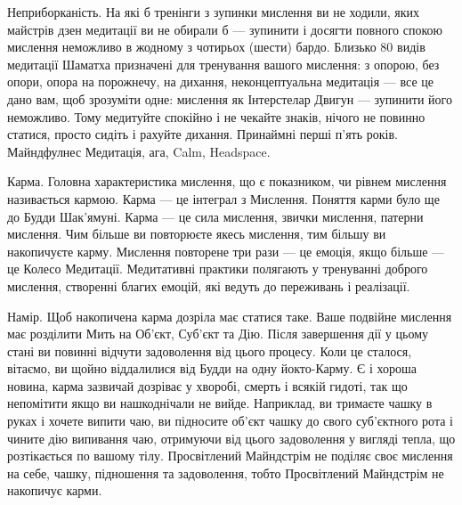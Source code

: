 Неприборканість. На які б тренінги з зупинки мислення ви не ходили,
яких майстрів дзен медитації ви не обирали б --- зупинити і досягти повного
спокою мислення неможливо в жодному з чотирьох (шести) бардо. Близько 80 видів медитації
Шаматха призначені для тренування вашого мислення: з опорою, без опори, опора на порожнечу,
на дихання, неконцептуальна медитація --- все це дано вам, щоб зрозуміти одне:
мислення як Інтерстелар Двигун --- зупинити його неможливо. Тому медитуйте спокійно
і не чекайте знаків, нічого не повинно статися, просто сидіть і рахуйте дихання.
Принаймні перші п'ять років. Майндфулнес Медитація, ага, Calm, Headspace.

Карма. Головна характеристика мислення, що є показником, чи рівнем мислення
називається кармою. Карма --- це інтеграл з Мислення. Поняття карми було ще
до Будди Шак'ямуні. Карма --- це сила мислення, звички мислення, патерни мислення.
Чим більше ви повторюєте якесь мислення, тим більшу ви накопичуєте карму.
Мислення повторене три рази --- це емоція, якщо більше --- це Колесо Медитації.
Медитативні практики полягають у тренуванні доброго мислення, створенні благих емоцій,
які ведуть до переживань і реалізації.

Намір. Щоб накопичена карма дозріла має статися таке. Ваше подвійне мислення
має розділити Мить на Об'єкт, Суб'єкт та Дію. Після завершення дії у цьому стані
ви повинні відчути задоволення від цього процесу. Коли це сталося, вітаємо,
ви щойно віддалилися від Будди на одну йокто-Карму. Є і хороша новина, карма
зазвичай дозріває у хворобі, смерть і всякій гидоті, так що непомітити якщо
ви нашкоднічали не вийде. Наприклад, ви тримаєте чашку в руках і хочете випити чаю,
ви підносите об'єкт чашку до свого суб'єктного рота і чините дію випивання чаю,
отримуючи від цього задоволення у вигляді тепла, що розтікається по вашому тілу.
Просвітлений Майндстрім не поділяє своє мислення на себе, чашку, підношення та
задоволення, тобто Просвітлений Майндстрім не накопичує карми.
